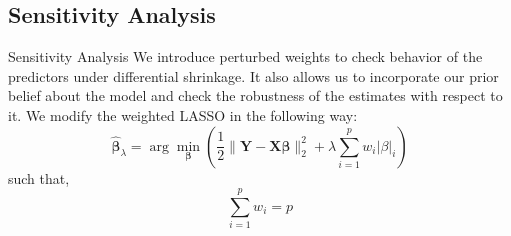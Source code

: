 \documentclass[tikz]{beamer}					%
\newcommand{\bbeta}{\bm{\beta}}
\newcommand{\hb}{\hat{\bbeta}}
\begin{document}
\subsection{Sensitivity Analysis}
{
\begin{frame}{Sensitivity Analysis}
We introduce perturbed weights to check behavior of the predictors
under differential shrinkage.
It also allows us to incorporate our prior belief about the model and check the
robustness of the estimates with respect to it.
We modify the weighted LASSO in the following way:
\begin{equation}
    \hb_{\lambda} = \arg\min_{\bbeta} \left(\frac{1}{2}\|\bm{Y}-\bm{X}\bbeta\|_2^2 +\lambda \sum_{i=1}^{p}w_i|\beta|_i \right)
\end{equation}
such that,
\begin{equation}
    \sum_{i=1}^{p}w_i = p
\end{equation}
\end{frame}
}
\end{document}
